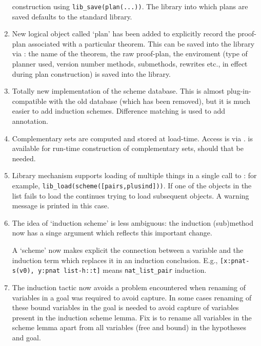 \begin{enumerate}
          construction using \verb|lib_save(plan(...))|.  The library into
          which plans are saved defaults to the standard library.
\item New logical object called `plan' has been added to
          explicitly record the proof-plan associated with a
          particular theorem.  This can be saved into the library via
          : the name of the theorem, the raw proof-plan, the
          \clam{} enviroment (type of planner used, \clam{} version number
          methods, submethods, rewrites etc., in effect during plan
          construction) is saved into the library.
\item Totally new implementation of the scheme database.  This is
          almost plug-in-compatible with the old database (which has
          been removed), but it is much easier to add induction
          schemes.  Difference matching is used to add annotation.
\item Complementary sets are computed and stored at
          load-time.  Access is via
.  is available
for run-time construction of complementary sets, should that be needed.
\item  Library mechanism supports loading of multiple things in a
          single call to : for example,
          \verb|lib_load(scheme([pairs,plusind]))|.   If one of the objects
          in the list fails to load the \clam{} continues trying to load
          subsequent objects.  A warning message is printed in this
          case. 
\item The idea of `induction scheme' is less ambiguous: the induction
          (sub)method now has a singe argument which  reflects  this
        important change.

          A `scheme' now makes explicit the connection between a
          variable and the induction term which replaces it in an
          induction conclusion.  E.g., \verb|[x:pnat-s(v0), y:pnat list-h::t]|
          means \verb|nat_list_pair| induction.
\item The induction tactic now avoids a problem encountered when
renaming of variables in a goal was required to avoid
          capture.  In some cases renaming of  these bound variables in the
          goal is needed to avoid capture of variables present in the
          induction scheme lemma.  Fix is to rename all variables
          in the scheme lemma apart from all variables (free and
          bound) in the hypotheses and goal.
\end{enumerate}


